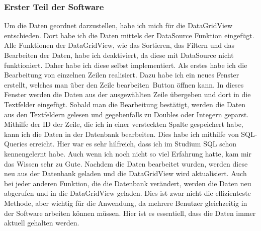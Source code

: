 \documentclass{Vorlage}
\begin{document}
\subsubsection{Erster Teil der Software}

Um die Daten geordnet darzustellen, habe ich mich für die DataGridView entschieden. Dort habe ich die Daten
mittels der DataSource Funktion eingefügt. Alle Funktionen der DataGridView, wie das Sortieren, das Filtern und
das Bearbeiten der Daten, habe ich deaktiviert, da diese mit DataSource nicht funktioniert.
Daher habe ich diese selbst implementiert. Als erstes habe ich die Bearbeitung von einzelnen Zeilen
realisiert. Dazu habe ich ein neues Fenster erstellt, welches man über den \glqq Zeile bearbeiten\grqq \,
Button öffnen kann. In dieses Fenster werden die Daten aus der ausgewählten Zeile übergeben und dort in
die Textfelder eingefügt. Sobald man die Bearbeitung bestätigt, werden die Daten aus den Textfeldern gelesen
und gegebenfalls zu Doubles oder Integern geparst. Mithilfe der ID der Zeile, die ich in einer versteckten
Spalte gespeichert habe, kann ich die Daten in der Datenbank bearbeiten. Dies habe ich mithilfe von SQL-Queries
erreicht. Hier war es sehr hilfreich, dass ich im Studium SQL schon kennengelernt habe. Auch wenn ich noch
nicht so viel Erfahrung hatte, kam mir das Wissen sehr zu Gute. Nachdem die Daten bearbeitet wurden, werden
diese neu aus der Datenbank geladen und die DataGridView wird aktualisiert.
Auch bei jeder anderen Funktion, die die Datenbank verändert, werden die Daten neu abgerufen und in die
DataGridView geladen. Dies ist zwar nicht die effizienteste Methode, aber wichtig für die Anwendung, da
mehrere Benutzer gleichzeitig in der Software arbeiten können müssen. Hier ist es essentiell, dass die Daten
immer aktuell gehalten werden. 
\end{document}
